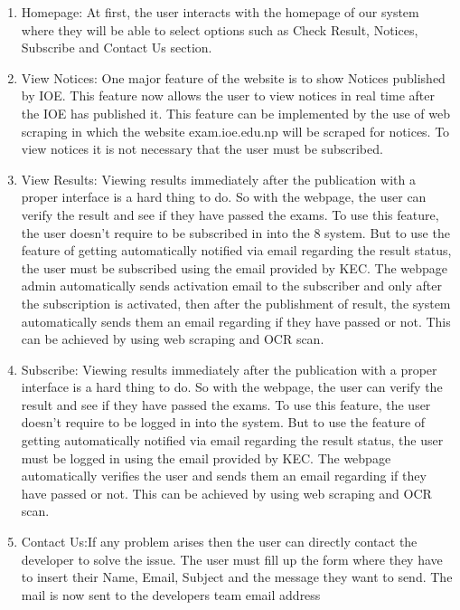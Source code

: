 \begin{enumerate}
	\item Homepage: At first, the user interacts with the homepage of our system where they will be able to 
select options such as Check Result, Notices, Subscribe and Contact Us section.

	\item View Notices: One major feature of the website is to show Notices published by IOE. This feature 
now allows the user to view notices in real time after the IOE has published it. This 
feature can be implemented by the use of web scraping in which the website 
exam.ioe.edu.np will be scraped for notices. To view notices it is not necessary that the 
user must be subscribed.
	\item  View Results: Viewing results immediately after the publication with a proper interface is a hard thing 
to do. So with the webpage, the user can verify the result and see if they have passed 
the exams. To use this feature, the user doesn’t require to be subscribed in into the 
8
system. But to use the feature of getting automatically notified via email regarding the 
result status, the user must be subscribed using the email provided by KEC. The 
webpage admin automatically sends activation email to the subscriber and only after 
the subscription is activated, then after the publishment of result, the system 
automatically sends them an email regarding if they have passed or not. This can be 
achieved by using web scraping and OCR scan.
	\item  Subscribe: Viewing results immediately after the publication with a proper interface is a hard thing 
to do. So with the webpage, the user can verify the result and see if they have passed 
the exams. To use this feature, the user doesn’t require to be logged in into the system. 
But to use the feature of getting automatically notified via email regarding the result 
status, the user must be logged in using the email provided by KEC. The webpage 
automatically verifies the user and sends them an email regarding if they have passed 
or not. This can be achieved by using web scraping and OCR scan.
	\item  Contact Us:If any problem arises then the user can directly contact the developer to solve the issue.
The user must fill up the form where they have to insert their Name, Email, Subject and 
the message they want to send. The mail is now sent to the developers team email 
address
	
\end{enumerate}
